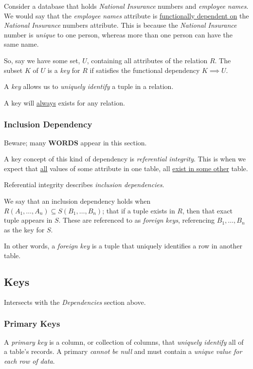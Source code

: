 \documentclass{article}
\begin{document}
Consider a database that holds \textit{National Insurance} numbers and \textit{employee names}. We would say that the \textit{employee names} attribute is \underline{functionally dependent on} the \textit{National Insurance} numbers attribute. This is because the \textit{National Insurance} number is \textit{unique} to one person, whereas more than one person can have the same name.

So, say we have some set, $U$, containing all attributes of the relation $R$. The subset $K$ of $U$ is a \textit{key} for $R$ if satisfies the functional dependency $K \implies U$.

A \textit{key} allows us to \textit{uniquely identify} a tuple in a relation.

A key will \underline{always} exists for any relation.

\subsubsection{Inclusion Dependency}

Beware; many \textbf{WORDS} appear in this section.

A key concept of this kind of dependency is \textit{referential integrity}. This is when we expect that \underline{all} values of some attribute in one table, all \underline{exist in some other} table.

Referential integrity describes \textit{inclusion dependencies}.

We say that an inclusion dependency holds when $R(A_1, \ldots, A_n) \subseteq S(B_1, \ldots, B_n)$; that if a tuple exists in $R$, then that exact tuple appears in $S$. These are referenced to as \textit{foreign keys}, referencing $B_1, \ldots, B_n$ as the key for $S$.

In other words, a \textit{foreign key} is a tuple that uniquely identifies a row in another table.

\filbreak
\subsection{Keys}

Intersects with the \textit{Dependencies} section above.

\subsubsection{Primary Keys}

A \textit{primary key} is a column, or collection of columns, that \textit{uniquely identify} all of a table's records. A primary \textit{cannot be null} and must contain a \textit{unique value for each row of data}.
\end{document}
